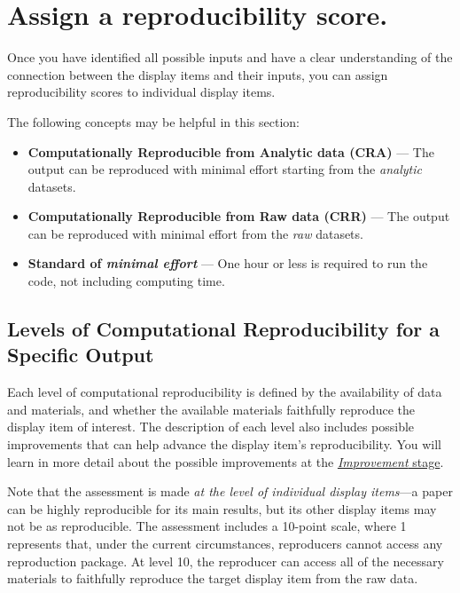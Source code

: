 \documentclass[
]{book}
\begin{document}
\hypertarget{score}{%
\section{Assign a reproducibility score.}\label{score}}

Once you have identified all possible inputs and have a clear understanding of the connection between the display items and their inputs, you can assign reproducibility scores to individual display items.

The following concepts may be helpful in this section:

\begin{itemize}
\item
  \textbf{Computationally Reproducible from Analytic data (CRA)} --- The output can be reproduced with minimal effort starting from the \emph{analytic} datasets.
\item
  \textbf{Computationally Reproducible from Raw data (CRR)} --- The output can be reproduced with minimal effort from the \emph{raw} datasets.
\item
  \textbf{Standard of \emph{minimal effort}} --- One hour or less is required to run the code, not including computing time.
\end{itemize}

\hypertarget{levels-of-computational-reproducibility-for-a-specific-output}{%
\subsection{Levels of Computational Reproducibility for a Specific Output}\label{levels-of-computational-reproducibility-for-a-specific-output}}

Each level of computational reproducibility is defined by the availability of data and materials, and whether the available materials faithfully reproduce the display item of interest. The description of each level also includes possible improvements that can help advance the display item's reproducibility. You will learn in more detail about the possible improvements at the \href{https://bitss.github.io/ACRE/improvements.html}{\emph{Improvement} stage}.

Note that the assessment is made \emph{at the level of individual display items}---a paper can be highly reproducible for its main results, but its other display items may not be as reproducible. The assessment includes a 10-point scale, where 1 represents that, under the current circumstances, reproducers cannot access any reproduction package. At level 10, the reproducer can access all of the necessary materials to faithfully reproduce the target display item from the raw data.
\end{document}
